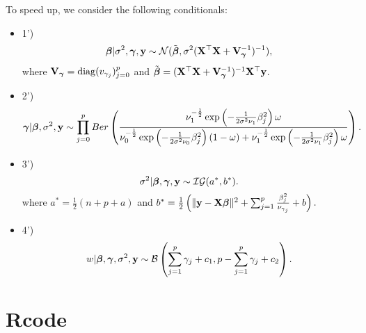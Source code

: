 \documentclass[]{book}
\begin{document}
To speed up, we consider the following conditionals:

\begin{itemize}
\item
  1')
  \[{\boldsymbol \beta}|\sigma^2, {\boldsymbol \gamma}, {\bf y}\sim \mathcal{N}(\tilde{{\boldsymbol \beta}}, {\sigma^2}({\bf X}^{\top}{\bf X}+{\bf V}^{-1}_{\boldsymbol \gamma})^{-1}),\]
  where \({\bf V}_{\boldsymbol \gamma}={\rm diag}(v_{\gamma_j})_{j=0}^p\) and \(\tilde{{\boldsymbol \beta}} = ({\bf X}^{\top}{\bf X}+{\bf V}^{-1}_{\boldsymbol \gamma})^{-1}{\bf X}^{\top}{\bf y}\).
\item
  2')
  \[
  {\boldsymbol \gamma}|{\boldsymbol \beta}, \sigma^2, {\bf y}\sim \prod_{j=0}^p Ber\left(\frac{ \nu_1^{-\frac{1}{2}}
    \exp\left(-\frac{1}{2\sigma^2\nu_1}\beta_j^2\right)\omega}
  {  \nu_0^{-\frac{1}{2}}\exp\left(-\frac{1}{2\sigma^2\nu_0}\beta_j^2\right)\left(1-\omega\right)+
   \nu_1^{-\frac{1}{2}}\exp\left(-\frac{1}{2\sigma^2\nu_1}\beta_j^2\right)\omega}\right).
  \]
\item
  3')
  \[\sigma^2|{\boldsymbol \beta}, {\boldsymbol \gamma}, {\bf y}\sim \mathcal{IG}(a^*,b^*).\]
  where \(a^*=\frac{1}{2}(n+p+a)\) and
  \(b^* = \frac{1}{2}\left(\|{\bf y}-{\bf X}{\boldsymbol \beta}\|^2 + \sum_{j=1}^{p}\frac{\beta_j^2}{\nu_{\gamma_j}} + b\right).\)
\item
  4')
  \[w|{\boldsymbol \beta},{\boldsymbol \gamma},\sigma^2,{\bf y}\sim \mathcal{B}\left(\sum_{j=1}^p \gamma_j+c_1,p-\sum_{j=1}^p \gamma_j+c_2\right).\]
\end{itemize}

\hypertarget{rcode}{%
\section{Rcode}\label{rcode}}
\end{document}
